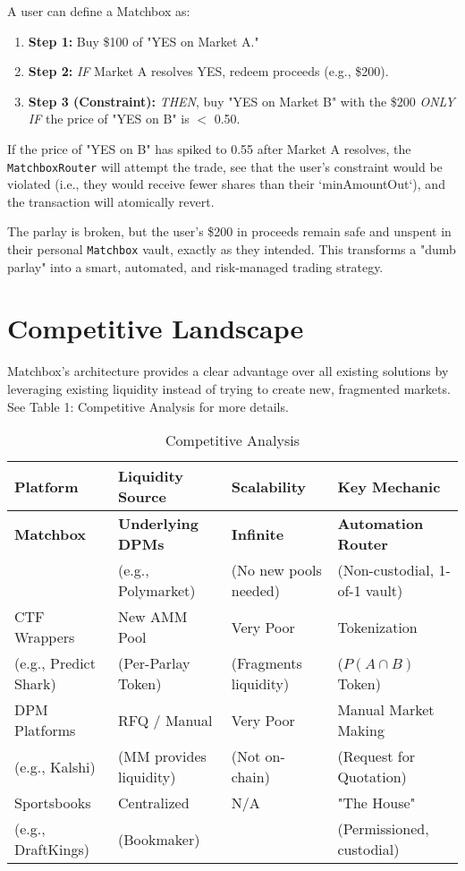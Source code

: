 \documentclass[11pt, a4paper]{article}
\begin{document}
A user can define a Matchbox as:
\begin{enumerate}
    \item \textbf{Step 1:} Buy \$100 of "YES on Market A."
    \item \textbf{Step 2:} \textit{IF} Market A resolves YES, redeem proceeds (e.g., \$200).
    \item \textbf{Step 3 (Constraint):} \textit{THEN}, buy "YES on Market B" with the \$200 \textit{ONLY IF} the price of "YES on B" is $<$ 0.50.
\end{enumerate}

If the price of "YES on B" has spiked to 0.55 after Market A resolves, the \texttt{MatchboxRouter} will attempt the trade, see that the user's constraint would be violated (i.e., they would receive fewer shares than their `minAmountOut`), and the transaction will atomically revert.

The parlay is broken, but the user's \$200 in proceeds remain safe and unspent in their personal \texttt{Matchbox} vault, exactly as they intended. This transforms a "dumb parlay" into a smart, automated, and risk-managed trading strategy.

\section{Competitive Landscape}
Matchbox's architecture provides a clear advantage over all existing solutions by leveraging existing liquidity instead of trying to create new, fragmented markets. See Table 1: Competitive Analysis for more details.

\begin{table}[h!]
\centering
\caption{Competitive Analysis}
\label{tab:comp}
\begin{tabular}{@{}llll@{}}
\toprule
\textbf{Platform} & \textbf{Liquidity Source} & \textbf{Scalability} & \textbf{Key Mechanic} \\
\midrule
\textbf{Matchbox} & \textbf{Underlying DPMs} & \textbf{Infinite} & \textbf{Automation Router} \\
 & (e.g., Polymarket) & (No new pools needed) & (Non-custodial, 1-of-1 vault) \\
\addlinespace
CTF Wrappers & New AMM Pool & Very Poor & Tokenization \\
(e.g., Predict Shark) & (Per-Parlay Token) & (Fragments liquidity) & ($P(A \cap B)$ Token) \\
\addlinespace
DPM Platforms & RFQ / Manual & Very Poor & Manual Market Making \\
(e.g., Kalshi) & (MM provides liquidity) & (Not on-chain) & (Request for Quotation) \\
\addlinespace
Sportsbooks & Centralized & N/A & "The House" \\
(e.g., DraftKings) & (Bookmaker) & & (Permissioned, custodial) \\
\bottomrule
\end{tabular}
\end{table}
\end{document}
